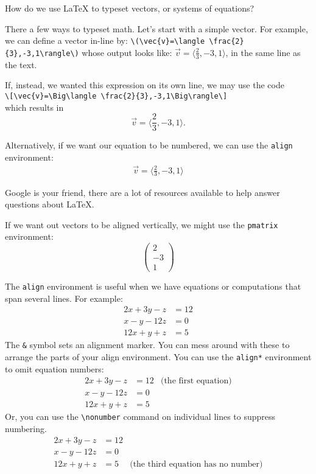 \documentclass[12pt]{article}
\newenvironment{problem}[2][Problem]
{
	\begin{trivlist} 
		\item[\hskip \labelsep {\bfseries #1 #2:}]
	}
{
	\end{trivlist}
	}
\newenvironment{solution}[1][Solution]
{
	\begin{trivlist} 
		\item[\hskip \labelsep {\itshape #1:}]
	}
	{
	\end{trivlist}
}
\begin{document}
%
\begin{problem}{7}
	How do we use {\LaTeX} to typeset vectors, or systems of equations?
\end{problem}
%
\begin{solution}
	There a few ways to typeset math. Let's start with a simple vector. For example, we can define a vector in-line by: \verb|\(\vec{v}=\langle \frac{2}{3},-3,1\rangle\)| whose output looks like: \(\vec{v}=\langle \frac{2}{3},-3,1\rangle\), in the same line as the text.
	
	If, instead, we wanted this expression on its own line, we may use the code\\
	\verb|\[\vec{v}=\Big\langle \frac{2}{3},-3,1\Big\rangle\]|\\
	which results in
	\[
	\vec{v}=\Bigg\langle \frac{2}{3},-3,1\Bigg\rangle.
	\]
	
	Alternatively, if we want our equation to be numbered, we can use the \verb|align| environment:
	\begin{align}
		\vec{v}=\Bigg\langle \frac{2}{3},-3,1\Bigg\rangle
	\end{align}
	
	Google is your friend, there are a lot of resources available to help answer questions about \LaTeX.
	
	If we want out vectors to be aligned vertically, we might use the \verb|pmatrix| environment:
	\[
	\begin{pmatrix} 2 \\ -3 \\ 1 \end{pmatrix}
	\]
	
	The \verb|align| environment is useful when we have equations or computations that span several lines. For example:
	\begin{align}
	2x+3y-z &= 12\\
	x-y-12z &= 0\\
	12x+y+z &= 5
	\end{align}
	The \verb|&| symbol sets an alignment marker. You can mess around with these to arrange the parts of your align environment. You can use the \verb|align*| environment to omit equation numbers:
	\begin{align*}
	2x+3y-z &= 12 & \text{(the first equation)}\\
	x-y-12z &= 0\\
	12x+y+z &= 5
	\end{align*}
	Or, you can use the \verb|\nonumber| command on individual lines to suppress numbering.
	\begin{align}
	2x+3y-z &= 12\\
	x-y-12z &= 0\\
	12x+y+z &= 5 & \text{(the third equation has no number)} \nonumber
	\end{align}
\end{solution}
\end{document}
